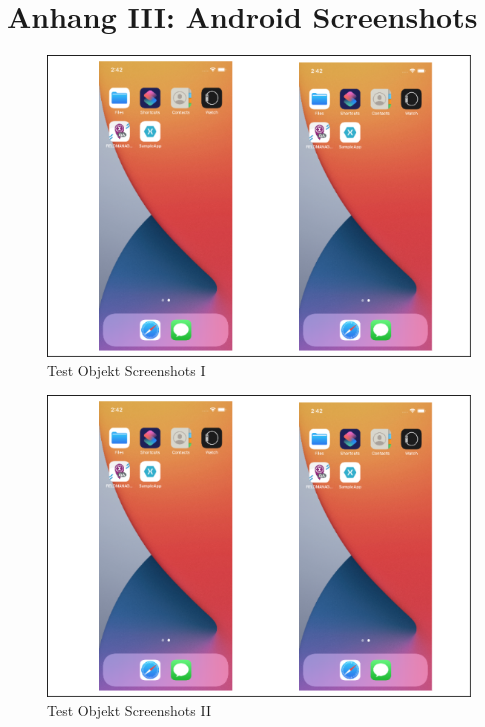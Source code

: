 \chapter{Anhang III: Android Screenshots}
\label{chap:AnhangAndroidScreenshots}

\begin{figure}[!ht]
 \includegraphics[width=\textwidth,keepaspectratio]{Images/Screenshot/AppIconAndMenu.png}
 \caption[]{Test Objekt Screenshots I}
\end{figure}

\begin{figure}[!ht]
 \includegraphics[width=\textwidth,keepaspectratio]{Images/Screenshot/AppIconAndMenu.png}
 \caption[]{Test Objekt Screenshots II}
\end{figure}

